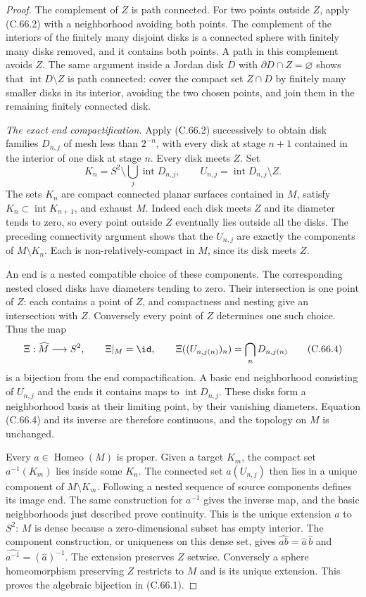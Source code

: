 \begin{proof}
The complement of $Z$ is path connected. For two
points outside $Z$, apply (C.66.2) with a neighborhood
avoiding both points. The complement of the interiors
of the finitely many disjoint disks is a connected
sphere with finitely many disks removed, and it
contains both points. A path in this complement
avoids $Z$. The same argument inside a Jordan disk
$D$ with $\partial D\cap Z=\varnothing$ shows that
$\operatorname{int}D\setminus Z$ is path connected:
cover the compact set $Z\cap D$ by finitely many
smaller disks in its interior, avoiding the two
chosen points, and join them in the remaining
finitely connected disk.

\emph{The exact end compactification.}
Apply (C.66.2) successively to obtain disk families
$D_{n,j}$ of mesh less than $2^{-n}$, with every
disk at stage $n+1$ contained in the interior of
one disk at stage $n$. Every disk meets $Z$.
Set
\[
 K_n=S^2\setminus\bigcup_j\operatorname{int}D_{n,j},
 \qquad
 U_{n,j}=\operatorname{int}D_{n,j}\setminus Z .
                                                               \tag{C.66.3}
\]
The sets $K_n$ are compact connected planar surfaces
contained in $M$, satisfy $K_n\subset\operatorname{int}K_{n+1}$,
and exhaust $M$. Indeed each disk meets $Z$ and its
diameter tends to zero, so every point outside $Z$
eventually lies outside all the disks. The preceding
connectivity argument shows that the $U_{n,j}$ are
exactly the components of $M\setminus K_n$.
Each is non-relatively-compact in $M$, since its
disk meets $Z$.

An end is a nested compatible choice of these
components. The corresponding nested closed disks
have diameters tending to zero. Their intersection
is one point of $Z$: each contains a point of $Z$,
and compactness and nesting give an intersection
with $Z$. Conversely every point of $Z$ determines
one such choice. Thus the map
\[
 \Xi:\widehat M\longrightarrow S^2,\qquad
 \Xi|_M=\id,\qquad
 \Xi((U_{n,j(n)})_n)=\bigcap_nD_{n,j(n)}
                                                               \tag{C.66.4}
\]
is a bijection from the end compactification.
A basic end neighborhood consisting of $U_{n,j}$
and the ends it contains maps to
$\operatorname{int}D_{n,j}$. These disks form a
neighborhood basis at their limiting point, by
their vanishing diameters. Equation (C.66.4)
and its inverse are therefore continuous,
and the topology on $M$ is unchanged.

Every $a\in\operatorname{Homeo}(M)$ is proper.
Given a target $K_m$, the compact set $a^{-1}(K_m)$
lies inside some $K_n$. The connected set
$a(U_{n,j})$ then lies in a unique component
of $M\setminus K_m$. Following a nested sequence
of source components defines its image end.
The same construction for $a^{-1}$ gives the
inverse map, and the basic neighborhoods just
described prove continuity. This is the unique
extension $\widehat a$ to $S^2$: $M$ is dense
because a zero-dimensional subset has empty
interior. The component construction, or
uniqueness on this dense set, gives
$\widehat{ab}=\widehat a\,\widehat b$ and
$\widehat{a^{-1}}=(\widehat a)^{-1}$.
The extension preserves $Z$ setwise.
Conversely a sphere homeomorphism preserving
$Z$ restricts to $M$ and is its unique extension.
This proves the algebraic bijection in (C.66.1).


\end{proof}
